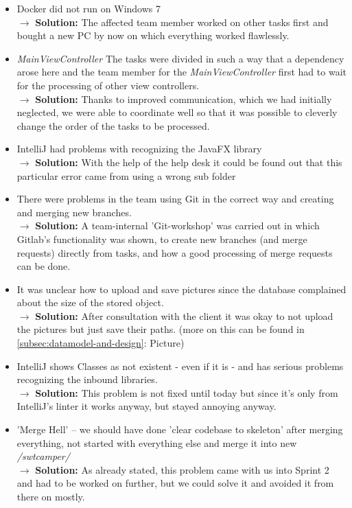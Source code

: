 \begin{itemize}
    \item Docker did not run on Windows 7 \\
    $\rightarrow$ \textbf{Solution:} The affected team member worked on other tasks first and bought a new PC by now on which everything worked flawlessly.
    \item \textit{MainViewController} The tasks were divided in such a way that a dependency arose here and the team member for the \textit{MainViewController} first had to wait for the processing of other view controllers.\\
    $\rightarrow$ \textbf{Solution:} Thanks to improved communication, which we had initially neglected, we were able to coordinate well so that it was possible to cleverly change the order of the tasks to be processed.
    \item IntelliJ had problems with recognizing the JavaFX library\\
    $\rightarrow$ \textbf{Solution:} With the help of the help desk it could be found out that this particular error came from using a wrong sub folder
    \item There were problems in the team using Git in the correct way and creating and merging new branches. \\
    $\rightarrow$ \textbf{Solution:} A team-internal 'Git-workshop' was carried out in which Gitlab's functionality was shown, to create new branches (and merge requests) directly from tasks, and how a good processing of merge requests can be done.
    \item It was unclear how to upload and save pictures since the database complained about the size of the stored object. \\
    $\rightarrow$ \textbf{Solution:} After consultation with the client it was okay to not upload the pictures but just save their paths. (more on this can be found in \ref{subsec:datamodel-and-design}: Picture)
    \item IntelliJ shows Classes as not existent - even if it is - and has serious problems recognizing the inbound libraries. \\
    $\rightarrow$ \textbf{Solution:} This problem is not fixed until today but since it's only from IntelliJ's linter it works anyway, but stayed annoying anyway.
    \item 'Merge Hell' – we should have done 'clear codebase to skeleton' after merging everything, not started with everything else and merge it into new \textit{/swtcamper/} \\
    $\rightarrow$ \textbf{Solution:} As already stated, this problem came with us into Sprint 2 and had to be worked on further, but we could solve it and avoided it from there on mostly.
\end{itemize}
